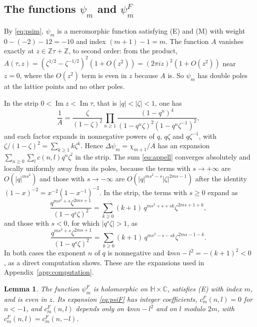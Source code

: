 \documentclass[11pt]{amsart}
\newtheorem{lemma}[theorem]{Lemma}
\theoremstyle{definition}
\newcommand{\ZZ}{\mathbb{Z}}
\newcommand{\CC}{\mathbb{C}}
\newcommand{\HH}{\mathbb{H}}
\newcommand{\cF}{c^{F}}
\begin{document}
\subsection{The functions \texorpdfstring{$\psi_m$}{psi\_m} and \texorpdfstring{$\psi^F_m$}{psi\textasciicircum F\_m}}
By \eqref{eq:psim}, $\psi_m$ is a meromorphic function satisfying (E) and (M) with weight $0-(-2)-12=-10$ and index $(m+1)-1=m$. The function $A$ vanishes exactly at $z\in\ZZ\tau+\ZZ$, to second order: from the product, $A(\tau,z)=(\zeta^{1/2}-\zeta^{-1/2})^2(1+O(z^2))=(2\pi iz)^2(1+O(z^2))$ near $z=0$, where the $O(z^2)$ term is even in $z$ because $A$ is. So $\psi_m$ has double poles at the lattice points and no other poles.

In the strip $0<\operatorname{Im}z<\operatorname{Im}\tau$, that is $|q|<|\zeta|<1$, one has
\[
\frac1A=\frac{\zeta}{(1-\zeta)^2}\prod_{n\ge1}\frac{(1-q^n)^4}{(1-q^n\zeta)^2(1-q^n\zeta^{-1})^2},
\]
and each factor expands in nonnegative powers of $q$, $q\zeta$ and $q\zeta^{-1}$, with $\zeta/(1-\zeta)^2=\sum_{k\ge1}k\zeta^k$. Hence $\Delta\psi_m=\chi_{m+1}/A$ has an expansion $\sum_{n\ge0}\sum_l c(n,l)q^n\zeta^l$ in the strip. The sum \eqref{eq:appell} converges absolutely and locally uniformly away from its poles, because the terms with $s\to+\infty$ are $O(|q|^{ms^2})$ and those with $s\to-\infty$ are $O(|q|^{ms^2-s}|\zeta|^{2ms-1})$ after the identity $(1-x)^{-2}=x^{-2}(1-x^{-1})^{-2}$. In the strip, the terms with $s\ge0$ expand as
\[
\frac{q^{ms^2+s}\zeta^{2ms+1}}{(1-q^s\zeta)^2}=\sum_{k\ge0}(k+1)\,q^{ms^2+s+sk}\zeta^{2ms+1+k},
\]
and those with $s<0$, for which $|q^s\zeta|>1$, as
\[
\frac{q^{ms^2+s}\zeta^{2ms+1}}{(1-q^s\zeta)^2}=\sum_{k\ge0}(k+1)\,q^{ms^2-s-sk}\zeta^{2ms-1-k}.
\]
In both cases the exponent $n$ of $q$ is nonnegative and $4mn-l^2=-(k+1)^2<0$, as a direct computation shows. These are the expansions used in Appendix~\ref{app:computation}.

\begin{lemma}\label{lem:poles}
The function $\psi^F_m$ is holomorphic on $\HH\times\CC$, satisfies (E) with index $m$, and is even in $z$. Its expansion \eqref{eq:psiF} has integer coefficients, $\cF_m(n,l)=0$ for $n<-1$, and $\cF_m(n,l)$ depends only on $4mn-l^2$ and on $l$ modulo $2m$, with $\cF_m(n,l)=\cF_m(n,-l)$.
\end{lemma}
\end{document}
